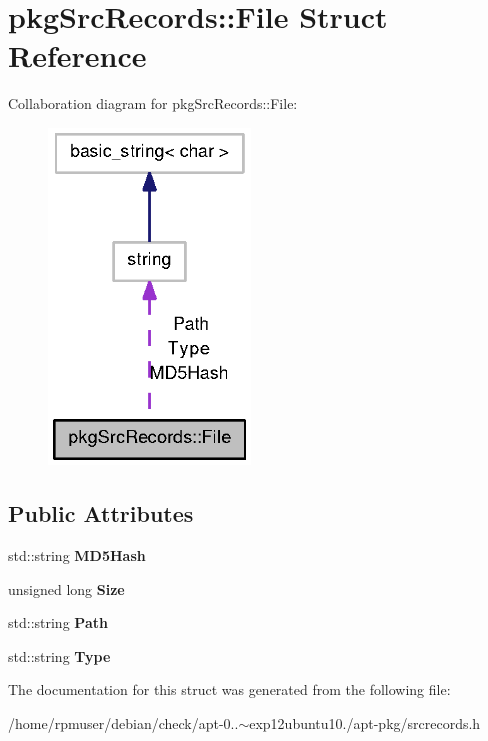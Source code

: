 \section{pkg\-Src\-Records\-:\-:\-File \-Struct \-Reference}
\label{structpkgSrcRecords_1_1File}


\-Collaboration diagram for pkg\-Src\-Records\-:\-:\-File\-:
\nopagebreak
\begin{figure}[H]
\begin{center}
\leavevmode
\includegraphics[width=152pt]{structpkgSrcRecords_1_1File__coll__graph}
\end{center}
\end{figure}
\subsection*{\-Public \-Attributes}
\begin{DoxyCompactItemize}
\item 
std\-::string {\bfseries \-M\-D5\-Hash}\label{structpkgSrcRecords_1_1File_a9121e1d4bb373ba413137f4e6acfeb43}

\item 
unsigned long {\bfseries \-Size}\label{structpkgSrcRecords_1_1File_adc25a45dd4fc0985b33c968068f749c4}

\item 
std\-::string {\bfseries \-Path}\label{structpkgSrcRecords_1_1File_a351e85bde61ab21378ab709e884be9ca}

\item 
std\-::string {\bfseries \-Type}\label{structpkgSrcRecords_1_1File_a6fcef4329ae329f0b7b6b8d739be7121}

\end{DoxyCompactItemize}


\-The documentation for this struct was generated from the following file\-:\begin{DoxyCompactItemize}
\item 
/home/rpmuser/debian/check/apt-\/0..$\sim$exp12ubuntu10./apt-\/pkg/srcrecords.\-h\end{DoxyCompactItemize}
